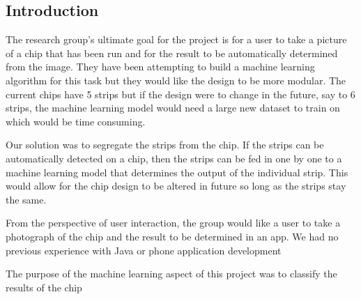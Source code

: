 \subsection{Introduction}
\label{sec:ai:introduction}

The research group's ultimate goal for the project is for a user to take a picture of a chip that has been run and for the result to be automatically determined from the image. They have been attempting to build a machine learning algorithm for this task but they would like the design to be more modular. The current chips have 5 strips but if the design were to change in the future, say to 6 strips, the machine learning model would need a large new dataset to train on which would be time consuming.

Our solution was to segregate the strips from the chip. If the strips can be automatically detected on a chip, then the strips can be fed in one by one to a machine learning model that determines the output of the individual strip. This would allow for the chip design to be altered in future so long as the strips stay the same.

From the perspective of user interaction, the group would like a user to take a photograph of the chip and the result to be determined in an app. We had no previous experience with Java or phone application development 

The purpose of the machine learning aspect of this project was to classify the results of the chip
